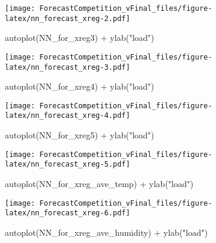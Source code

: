 \documentclass[
]{article}
\newenvironment{Shaded}{\begin{snugshade}}{\end{snugshade}}
\newcommand{\FunctionTok}[1]{\textcolor[rgb]{0.00,0.00,0.00}{#1}}
\newcommand{\NormalTok}[1]{#1}
\newcommand{\SpecialCharTok}[1]{\textcolor[rgb]{0.00,0.00,0.00}{#1}}
\newcommand{\StringTok}[1]{\textcolor[rgb]{0.31,0.60,0.02}{#1}}
\begin{document}
\texttt{[image: ForecastCompetition\_vFinal\_files/figure-latex/nn\_forecast\_xreg-2.pdf]}

\begin{Shaded}
\begin{Highlighting}[]
\FunctionTok{autoplot}\NormalTok{(NN\_for\_xreg3) }\SpecialCharTok{+} \FunctionTok{ylab}\NormalTok{(}\StringTok{"load"}\NormalTok{) }
\end{Highlighting}
\end{Shaded}

\texttt{[image: ForecastCompetition\_vFinal\_files/figure-latex/nn\_forecast\_xreg-3.pdf]}

\begin{Shaded}
\begin{Highlighting}[]
\FunctionTok{autoplot}\NormalTok{(NN\_for\_xreg4) }\SpecialCharTok{+} \FunctionTok{ylab}\NormalTok{(}\StringTok{"load"}\NormalTok{) }
\end{Highlighting}
\end{Shaded}

\texttt{[image: ForecastCompetition\_vFinal\_files/figure-latex/nn\_forecast\_xreg-4.pdf]}

\begin{Shaded}
\begin{Highlighting}[]
\FunctionTok{autoplot}\NormalTok{(NN\_for\_xreg5) }\SpecialCharTok{+} \FunctionTok{ylab}\NormalTok{(}\StringTok{"load"}\NormalTok{) }
\end{Highlighting}
\end{Shaded}

\texttt{[image: ForecastCompetition\_vFinal\_files/figure-latex/nn\_forecast\_xreg-5.pdf]}

\begin{Shaded}
\begin{Highlighting}[]
\FunctionTok{autoplot}\NormalTok{(NN\_for\_xreg\_ave\_temp) }\SpecialCharTok{+} \FunctionTok{ylab}\NormalTok{(}\StringTok{"load"}\NormalTok{) }
\end{Highlighting}
\end{Shaded}

\texttt{[image: ForecastCompetition\_vFinal\_files/figure-latex/nn\_forecast\_xreg-6.pdf]}

\begin{Shaded}
\begin{Highlighting}[]
\FunctionTok{autoplot}\NormalTok{(NN\_for\_xreg\_ave\_humidity) }\SpecialCharTok{+} \FunctionTok{ylab}\NormalTok{(}\StringTok{"load"}\NormalTok{) }
\end{Highlighting}
\end{Shaded}
\end{document}
